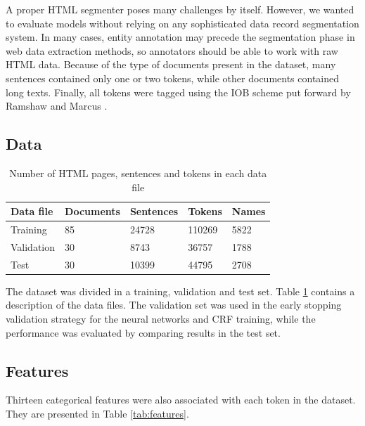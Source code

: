 \documentclass{nle}
\begin{document}
A proper HTML segmenter poses many challenges by itself.
However, we wanted to evaluate models without relying on any sophisticated data record
segmentation system. In many cases, entity annotation may precede the segmentation
phase in web data extraction methods, so annotators should be able to work with
raw HTML data. Because of the type of documents present in the dataset, many sentences 
contained only one or two tokens, while other documents contained long texts.
Finally, all tokens were tagged using the IOB scheme put forward by
Ramshaw and Marcus \cite{Ramshaw1999}. 

\subsection{Data}

\begin{table}[h]
  \small
  \begin{center}
    \begin{tabular}{ lllll }
      \toprule
      Data file & Documents & Sentences & Tokens & Names \\
      \midrule
      Training    & 85 & 24728 & 110269 & 5822 \\  
      Validation  & 30 & 8743  & 36757  & 1788 \\
      Test        & 30 & 10399 & 44795  & 2708 \\
      \bottomrule
    \end{tabular}
  \end{center}
  \caption{Number of HTML pages, sentences and tokens in each data file}
  \label{tab:dataset}
\end{table}

The dataset was divided in a training, validation and test set. Table \ref{tab:dataset} contains
a description of the data files. The validation set was used in the early stopping validation strategy
for the neural networks and CRF training, while the performance was evaluated by comparing results in the test set.

\subsection{Features}

Thirteen categorical features were also associated with each token in the dataset. They 
are presented in Table \ref{tab:features}.
\end{document}
